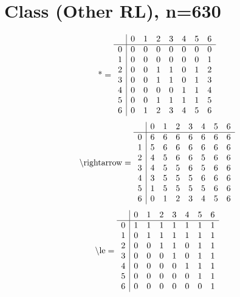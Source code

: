 \documentclass[11pt]{article}
\begin{document}
\section{Class (Other RL), n=630}
\[\text{*} = 
\begin{array}{r | r r r r r r r}
 & 0 & 1 & 2 & 3 & 4 & 5 & 6 \\ \hline
0 & 0 & 0 & 0 & 0 & 0 & 0 & 0 \\
1 & 0 & 0 & 0 & 0 & 0 & 0 & 1 \\
2 & 0 & 0 & 1 & 1 & 0 & 1 & 2 \\
3 & 0 & 0 & 1 & 1 & 0 & 1 & 3 \\
4 & 0 & 0 & 0 & 0 & 1 & 1 & 4 \\
5 & 0 & 0 & 1 & 1 & 1 & 1 & 5 \\
6 & 0 & 1 & 2 & 3 & 4 & 5 & 6 \\
\end{array}
\]
\[\text{\textbackslash rightarrow} = 
\begin{array}{r | r r r r r r r}
 & 0 & 1 & 2 & 3 & 4 & 5 & 6 \\ \hline
0 & 6 & 6 & 6 & 6 & 6 & 6 & 6 \\
1 & 5 & 6 & 6 & 6 & 6 & 6 & 6 \\
2 & 4 & 5 & 6 & 6 & 5 & 6 & 6 \\
3 & 4 & 5 & 5 & 6 & 5 & 6 & 6 \\
4 & 3 & 5 & 5 & 5 & 6 & 6 & 6 \\
5 & 1 & 5 & 5 & 5 & 5 & 6 & 6 \\
6 & 0 & 1 & 2 & 3 & 4 & 5 & 6 \\
\end{array}
\]
\[\text{\textbackslash le} = 
\begin{array}{r | r r r r r r r}
 & 0 & 1 & 2 & 3 & 4 & 5 & 6 \\ \hline
0 & 1 & 1 & 1 & 1 & 1 & 1 & 1 \\
1 & 0 & 1 & 1 & 1 & 1 & 1 & 1 \\
2 & 0 & 0 & 1 & 1 & 0 & 1 & 1 \\
3 & 0 & 0 & 0 & 1 & 0 & 1 & 1 \\
4 & 0 & 0 & 0 & 0 & 1 & 1 & 1 \\
5 & 0 & 0 & 0 & 0 & 0 & 1 & 1 \\
6 & 0 & 0 & 0 & 0 & 0 & 0 & 1 \\
\end{array}
\]
\end{document}
